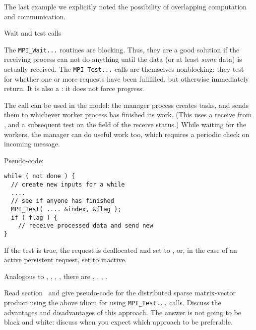 
The last example we explicitly noted the possibility of
overlapping computation and communication.

 {Wait and test calls}
\label{sec:mpitest}
\label{sec:mpi-test}

The \lstinline{MPI_Wait...} routines are blocking. Thus, they are a good solution if 
the receiving process can not do anything until the data 
(or at least \emph{some} data) is actually received.
The \lstinline{MPI_Test...} calls are themselves nonblocking: they
test for whether one or more requests have been
fullfilled, but otherwise immediately return.
It is also a : it does not force progress.

The  call can be used in the
 model: the manager process creates tasks, and
sends them to whichever worker process has finished its work.
(This uses a receive from , and a
subsequent test on the  field of the receive status.)
While waiting for the workers, the manager can do useful work too,
which requires a periodic check on incoming message.

Pseudo-code:
\begin{lstlisting}
while ( not done ) {
  // create new inputs for a while
  ....
  // see if anyone has finished
  MPI_Test( .... &index, &flag );
  if ( flag ) {
    // receive processed data and send new
}
\end{lstlisting}

If the test is true, the request is deallocated and set to ,
or, in the case of an active persistent request, set to inactive.

Analogous to , ,
, ,
there are
,
,
,
.

\begin{exercise}
  Read section~ and give pseudo-code for the
    distributed sparse matrix-vector product using the above idiom for
    using \lstinline{MPI_Test...} calls. Discuss the advantages and
    disadvantages of this approach. The answer is not going to be
    black and white: discuss when you expect which approach to be
    preferable.
\end{exercise}

